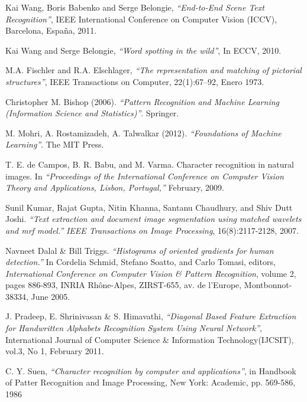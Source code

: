 \newpage	
{}		%

\begin{thebibliography}{100}

 	 	Kai Wang, Boris Babenko and Serge Belongie,
	 	\emph{``End-to-End Scene Text Recognition''},
		IEEE International Conference on Computer Vision (ICCV), 
		Barcelona, España,
		2011.
		
 	 	Kai Wang and Serge Belongie,
	 	\emph{``Word spotting in the wild''},
		In ECCV, 2010.
		
 	 	M.A. Fischler and R.A. Elschlager,
	 	\emph{``The representation and matching of pictorial
structures''},
		IEEE Transactions on Computer, 
		22(1):67–92,
		Enero 1973.
		
		Christopher M. Bishop (2006).
		\emph{``Pattern Recognition and Machine Learning (Information Science and Statistics)''}.
		Springer.
		
	 	M. Mohri, A. Rostamizadeh, A. Talwalkar (2012).
	 	\emph{``Foundations of Machine Learning''}.
	 	The MIT Press.
		
		T. E. de Campos, B. R. Babu, and M. Varma.
		Character recognition in natural images.
		In \emph{``Proceedings of the International Conference on Computer Vision Theory and Applications, Lisbon, Portugal,''}
		February, 2009.
		
		Sunil Kumar, Rajat Gupta, Nitin Khanna, Santanu Chaudhury, and Shiv Dutt Joshi.
		\emph{``Text extraction and document image segmentation using matched wavelets and mrf model.''}
		\textit{IEEE Transactions on Image Processing}, 16(8):2117-2128, 2007.
	
		Navneet Dalal \& Bill Triggs.
		\emph{``Histograms of oriented gradients for human detection.''}
		In Cordelia Schmid, Stefano Soatto, and Carlo Tomasi, editors, \textit{International Conference on Computer Vision \& Pattern Recognition}, volume 2, pages 886-893, INRIA Rh\^{o}ne-Alpes, ZIRST-655, av. de l'Europe, Montbonnot-38334, June 2005.
		
		J. Pradeep, E. Shrinivasan \& S. Himavathi,
		\emph{``Diagonal Based Feature Extraction for Handwritten Alphabets Recognition System Using Neural Network''},
		International Journal of Computer Science \& Information Technology(IJCSIT),
		vol.3, No 1, February 2011.
		
		C. Y. Suen,
		\emph{``Character recognition by computer and applications''},
		in Handbook of Patter Recognition and Image Processing,
		New York: Academic,
		pp. 569-586,
		1986


\end{thebibliography}

